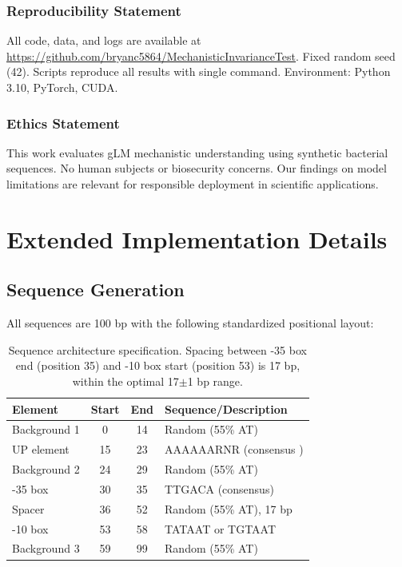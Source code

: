 \documentclass{article}
\begin{document}
\subsubsection*{Reproducibility Statement}

All code, data, and logs are available at \url{https://github.com/bryanc5864/MechanisticInvarianceTest}. Fixed random seed (42). Scripts reproduce all results with single command. Environment: Python 3.10, PyTorch, CUDA.

\subsubsection*{Ethics Statement}

This work evaluates gLM mechanistic understanding using synthetic bacterial sequences. No human subjects or biosecurity concerns. Our findings on model limitations are relevant for responsible deployment in scientific applications.




\newpage
\appendix

\section{Extended Implementation Details}
\label{app:methods}

\subsection{Sequence Generation}

All sequences are 100 bp with the following standardized positional layout:

\begin{table}[H]
\caption{Sequence architecture specification. Spacing between -35 box end (position 35) and -10 box start (position 53) is 17 bp, within the optimal 17$\pm$1 bp range.}
\label{tab:seq_layout}
\begin{center}
\small
\begin{tabular}{lccl}
\toprule
Element & Start & End & Sequence/Description \\
\midrule
Background 1 & 0 & 14 & Random (55\% AT) \\
UP element & 15 & 23 & AAAAAARNR (consensus \citep{estrem1998identification}) \\
Background 2 & 24 & 29 & Random (55\% AT) \\
-35 box & 30 & 35 & TTGACA (consensus) \\
Spacer & 36 & 52 & Random (55\% AT), 17 bp \\
-10 box & 53 & 58 & TATAAT or TGTAAT \\
Background 3 & 59 & 99 & Random (55\% AT) \\
\bottomrule
\end{tabular}
\end{center}
\end{table}
\end{document}
